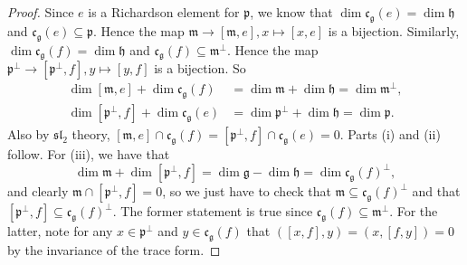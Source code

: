 \documentclass[twoside,12pt,reqno]{amsart}
\begin{document}
\begin{proof}
Since $e$ is a Richardson element for $\mathfrak{p}$,
we know that $\dim \mathfrak{c}_{\mathfrak{g}}(e)
= \dim \mathfrak{h}$ and
$\mathfrak{c}_{\mathfrak{g}}(e) \subseteq \mathfrak{p}$.
Hence the map $\mathfrak{m} \rightarrow [\mathfrak{m},e],
x \mapsto [x,e]$ is a bijection.
Similarly, $\dim \mathfrak{c}_{\mathfrak{g}}(f)
= \dim \mathfrak{h}$ and
$\mathfrak{c}_{\mathfrak{g}}(f) \subseteq \mathfrak{m}^\perp$.
Hence the map $\mathfrak{p}^\perp \rightarrow [\mathfrak{p}^\perp,f],
y \mapsto [y,f]$ is a bijection.
So
\begin{align*}
\dim [\mathfrak{m},e] + \dim \mathfrak{c}_{\mathfrak{g}}(f)
&= \dim \mathfrak{m} + \dim \mathfrak{h}
= \dim \mathfrak{m}^{\perp},\\
\dim [\mathfrak{p}^\perp,f] + \dim \mathfrak{c}_{\mathfrak{g}}(e)
&= \dim \mathfrak{p}^\perp + \dim \mathfrak{h}
= \dim \mathfrak{p}.
\end{align*}
Also by $\mathfrak{sl}_2$ theory,
$[\mathfrak{m},e] \cap \mathfrak{c}_{\mathfrak{g}}(f)= 
[\mathfrak{p}^\perp,f] \cap \mathfrak{c}_{\mathfrak{g}}(e) = 0$.
Parts (i) and (ii) follow.
For (iii), we have that
$$
\dim \mathfrak{m} + \dim [\mathfrak{p}^\perp,f]
= \dim \mathfrak{g} - \dim \mathfrak{h} = \dim \mathfrak{c}_{\mathfrak{g}}(f)^\perp,
$$
and clearly $\mathfrak{m} \cap [\mathfrak{p}^\perp,f] = 0$,
so we just have to check
that $\mathfrak{m} \subseteq \mathfrak{c}_{\mathfrak{g}}(f)^\perp$
and that
$[\mathfrak{p}^\perp,f] 
\subseteq \mathfrak{c}_{\mathfrak{g}}(f)^\perp$.
The former statement is true since 
$\mathfrak{c}_{\mathfrak{g}}(f) \subseteq \mathfrak{m}^\perp$.
For the latter, note for any $x \in \mathfrak{p}^\perp$
and $y \in \mathfrak{c}_{\mathfrak{g}}(f)$ that
$([x,f],y) = (x,[f,y]) =0$ by the invariance of the trace
form.
\end{proof}
\end{document}

